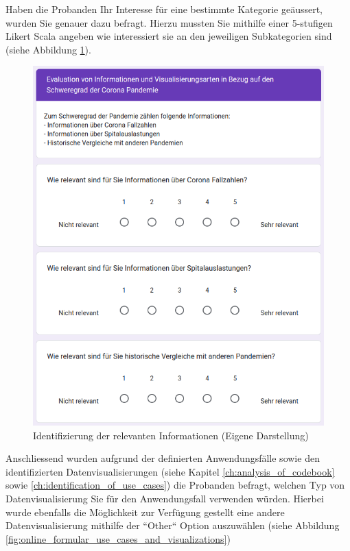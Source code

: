 \clearpage
Haben die Probanden Ihr Interesse für eine bestimmte Kategorie geäussert, wurden Sie genauer dazu befragt. Hierzu mussten Sie mithilfe einer 5-stufigen Likert Scala angeben wie interessiert sie an den jeweiligen Subkategorien sind (siehe Abbildung \ref{fig:online_formular_identification_of_relevant_information}).

\begin{figure}[h]
    \includegraphics[width=12cm]{images/online_formular_identification_of_relevant_information.png}
    \centering
    \caption{Identifizierung der relevanten Informationen (Eigene Darstellung)}
    \label{fig:online_formular_identification_of_relevant_information}
\end{figure}

\clearpage
Anschliessend wurden aufgrund der definierten Anwendungsfälle sowie den identifizierten Datenvisualisierungen (siehe Kapitel \ref{ch:analysis_of_codebook} sowie \ref{ch:identification_of_use_cases}) die Probanden befragt, welchen Typ von Datenvisualisierung Sie für den Anwendungsfall verwenden würden. Hierbei wurde ebenfalls die Möglichkeit zur Verfügung gestellt eine andere Datenvisualisierung mithilfe der ``Other`` Option auszuwählen (siehe Abbildung \ref{fig:online_formular_use_cases_and_visualizations})

